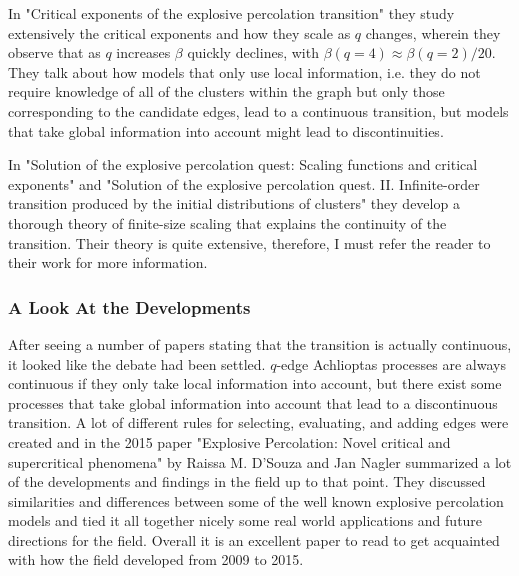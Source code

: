 In "Critical exponents of the explosive percolation transition" \cite{da_Costa_5} they study extensively the critical exponents and how they scale as $q$ changes, wherein they observe that as $q$ increases $\beta$ quickly declines, with $\beta(q = 4) \approx \beta(q = 2) / 20$.
They talk about how models that only use local information, i.e. they do not require knowledge of all of the clusters within the graph but only those corresponding to the candidate edges, lead to a continuous transition, but models that take global information into account might lead to discontinuities.

In "Solution of the explosive percolation quest: Scaling functions and critical exponents" \cite{da_Costa_2}
and "Solution of the explosive percolation quest. II. Infinite-order transition produced by the initial distributions of clusters" \cite{da_Costa_3} they develop a thorough theory of finite-size scaling that explains the continuity of the transition.
Their theory is quite extensive, therefore, I must refer the reader to their work for more information.



\subsubsection{A Look At the Developments}
After seeing a number of papers stating that the transition is actually continuous, it looked like the debate had been settled.
$q$-edge Achlioptas processes are always continuous if they only take local information into account, but there exist some processes that take global information into account that lead to a discontinuous transition.
A lot of different rules for selecting, evaluating, and adding edges were created and in the 2015 paper "Explosive Percolation: Novel critical and supercritical phenomena" \cite{D_Souza_2} by Raissa M. D’Souza and Jan Nagler summarized a lot of the developments and findings in the field up to that point.
They discussed similarities and differences between some of the well known explosive percolation models and tied it all together nicely some real world applications and future directions for the field.
Overall it is an excellent paper to read to get acquainted with how the field developed from 2009 to 2015.
